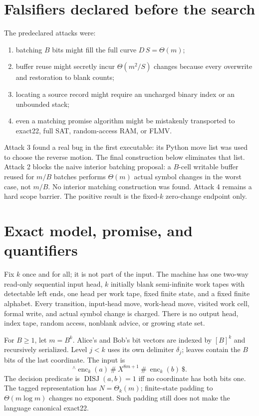 \documentclass[11pt]{article}
\begin{document}
\section{Falsifiers declared before the search}
The predeclared attacks were:
\begin{enumerate}
\item batching $B$ bits might fill the full curve $D\,S=\Theta(m)$;
\item buffer reuse might secretly incur $\Theta(m^2/S)$ changes because every
  overwrite and restoration to blank counts;
\item locating a source record might require an uncharged binary index or an
  unbounded stack;
\item even a matching promise algorithm might be mistakenly transported to
  exact22, full SAT, random-access RAM, or FLMV.
\end{enumerate}
Attack 3 found a real bug in the first executable: its Python move list was
used to choose the reverse motion.  The final construction below eliminates
that list.  Attack 2 blocks the naive interior batching proposal: a
$B$-cell writable buffer reused for $m/B$ batches performs $\Theta(m)$
actual symbol changes in the worst case, not $m/B$.  No interior matching
construction was found.  Attack 4 remains a hard scope barrier.  The positive
result is the fixed-$k$ zero-change endpoint only.

\section{Exact model, promise, and quantifiers}
Fix $k$ once and for all; it is not part of the input.  The machine has one
two-way read-only sequential input head, $k$ initially blank semi-infinite
work tapes with detectable left ends, one head per work tape, fixed finite
state, and a fixed finite alphabet.  Every transition, input-head move,
work-head move, visited work cell, formal write, and actual symbol change is
charged.  There is no output head, index tape, random access, nonblank advice,
or growing state set.

For $B\geq1$, let $m=B^k$.  Alice's and Bob's bit vectors are indexed by
$[B]^k$ and recursively serialized.  Level $j<k$ uses its own delimiter
$\delta_j$; leaves contain the $B$ bits of the last coordinate.  The input is
\[
 {}^{\wedge}\operatorname{enc}_k(a)\ \#\ X^{8m+1}\ \#\
 \operatorname{enc}_k(b)\ \$ .                       \tag{2}
\]
The decision predicate is
$\operatorname{DISJ}(a,b)=1$ iff no coordinate has both bits one.  The
tagged representation has $N=\Theta_k(m)$; finite-state padding to
$\Theta(m\log m)$ changes no exponent.  Such padding still does not make the
language canonical exact22.
\end{document}
